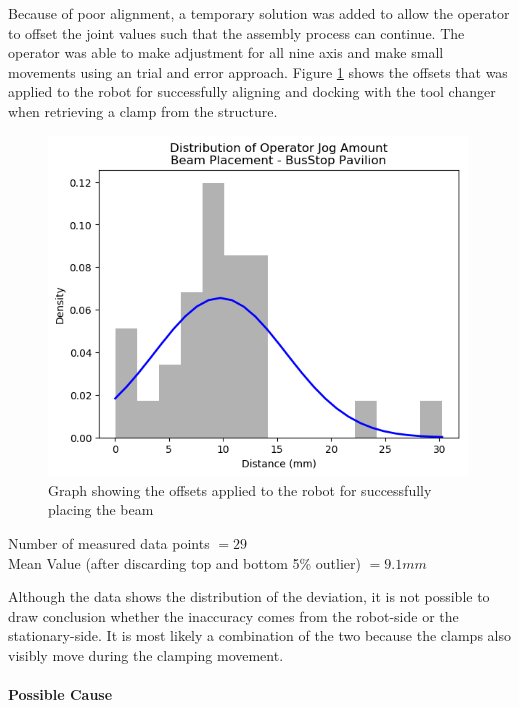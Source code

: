 Because of poor alignment, a temporary solution was added to allow the operator to offset the joint values such that the assembly process can continue. The operator was able to make adjustment for all nine axis and make small movements using an trial and error approach. Figure \ref{fig:offsets-applied-manually} shows the offsets that was applied to the robot for successfully aligning and docking with the tool changer when retrieving a clamp from the structure.

\begin{figure}[!h]
    \centering
    \includegraphics[width=0.99\textwidth]{images/6b/img07.png}
    \caption{Graph showing the offsets applied to the robot for successfully placing the beam}
    \label{fig:offsets-applied-manually}
\end{figure}


{\footnotesize Number of measured data points $= 29$ \\ Mean Value (after discarding top and bottom 5\% outlier) $= 9.1mm$}

Although the data shows the distribution of the deviation, it is not possible to draw conclusion whether the inaccuracy comes from the robot-side or the stationary-side. It is most likely a combination of the two because the clamps also visibly move during the clamping movement.

\FloatBarrier

\paragraph{Possible Cause}


